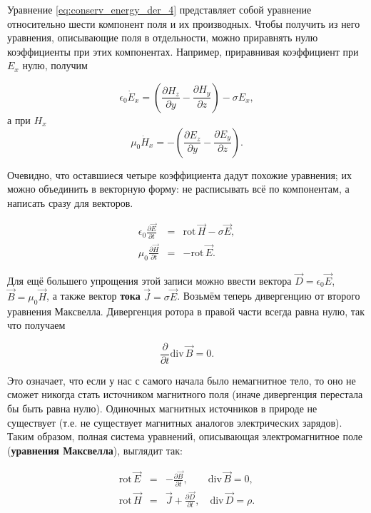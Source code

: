 \documentclass[11pt,a4paper]{article}
\numberwithin{equation}{section}
\newcommand{\nn}{\nonumber}
\newcommand{\pt}{\partial}
\newcommand{\rot}{\mathrm{rot}\,}
\renewcommand{\div}{\mathrm{div}\,}
\newcommand{\eps}{\epsilon}
\begin{document}
Уравнение \eqref{eq:conserv_energy_der_4} представляет собой уравнение
относительно шести компонент поля и их производных. Чтобы получить из
него уравнения, описывающие поля в отдельности, можно приравнять нулю
коэффициенты при этих компонентах. Например, приравнивая коэффициент
при $E_x$ нулю, получим

\begin{equation}
  \label{eq:conserv_energy_der_5}
  \eps_0 \dot{E}_x = \left( \frac{\pt H_z}{\pt y} - \frac{\pt H_y}{\pt
      z}\right) - \sigma E_x,
\end{equation}
а при $H_x$ 
\begin{equation}
  \label{eq:conserv_energy_der_5}
  \mu_0 \dot{H}_x = -\left( \frac{\pt E_z}{\pt y} - \frac{\pt
      E_y}{\pt z}\right).
\end{equation}

Очевидно, что оставшиеся четыре коэффициента дадут похожие уравнения;
их можно объединить в векторную форму: не расписывать всё по
компонентам, а написать сразу для векторов.

\begin{eqnarray}
  \label{eq:maxwell_half}
\nn
  \eps_0 \frac{\pt \vec{E}}{\pt t} &=& \rot \vec{H} - \sigma
  \vec{E},\\
  \mu_0 \frac{\pt \vec{H}}{\pt t} &=& -\rot \vec{E}.
\end{eqnarray}

Для ещё большего упрощения этой записи можно ввести вектора $\vec{D} =
\eps_0 \vec{E}$, $\vec{B} = \mu_0 \vec{H}$, а также вектор
\textbf{тока} $\vec{J} = \sigma \vec{E}$. Возьмём теперь дивергенцию
от второго уравнения Максвелла. Дивергенция ротора в правой части
всегда равна нулю, так что получаем

\begin{equation}
  \label{eq:gauss_magnet}
  \frac{\pt}{\pt t} \div \vec{B} = 0.
\end{equation}

Это означает, что если у нас с самого начала было немагнитное тело, то
оно не сможет никогда стать источником магнитного поля (иначе
дивергенция перестала бы быть равна нулю). Одиночных магнитных
источников в природе не существует (т.е. не существует магнитных
аналогов электрических зарядов). Таким образом, полная система
уравнений, описывающая электромагнитное поле (\textbf{уравнения
  Максвелла}), выглядит так:

\begin{eqnarray}
  \label{eq:maxwell_equations}
  \nn
  \rot \vec{E} &=& - \frac{\pt \vec{B}}{\pt t}, \qquad \div \vec{B} = 0,\\
  \rot \vec{H} &=& \vec{J} + \frac{\pt \vec{D}}{\pt t}, \quad \div
  \vec{D} = \rho.
\end{eqnarray}
\end{document}
